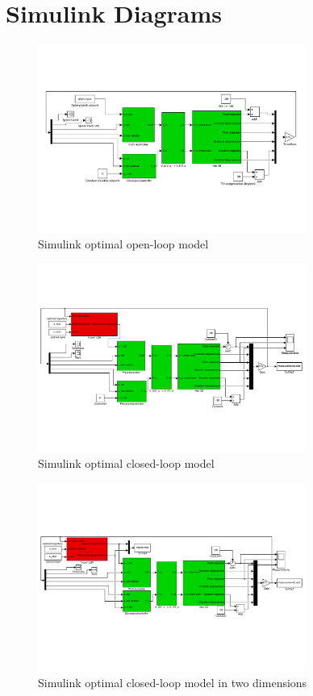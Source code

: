 \section{Simulink Diagrams}\label{sec:simulink}
\begin{figure}[ht!]
	\centering
 	\includegraphics[width = 0.78\textwidth]{figures/day2/day2_mdl}
 	\caption{Simulink optimal open-loop model}
 	\label{fig:simulink_day2}
\end{figure}
\begin{figure}[ht!]
	\centering
 	\includegraphics[width = 0.78\textwidth]{figures/day3/day3_mdl}
 	\caption{Simulink optimal closed-loop model}
 	\label{fig:simulink_day3}
\end{figure}
\begin{figure}[ht!]
	\centering
 	\includegraphics[width = 0.78\textwidth]{figures/day4_cl/day4_cl_mdl}
 	\caption{Simulink optimal closed-loop model in two dimensions}
 	\label{fig:simulink_day4_cl}
\end{figure}
